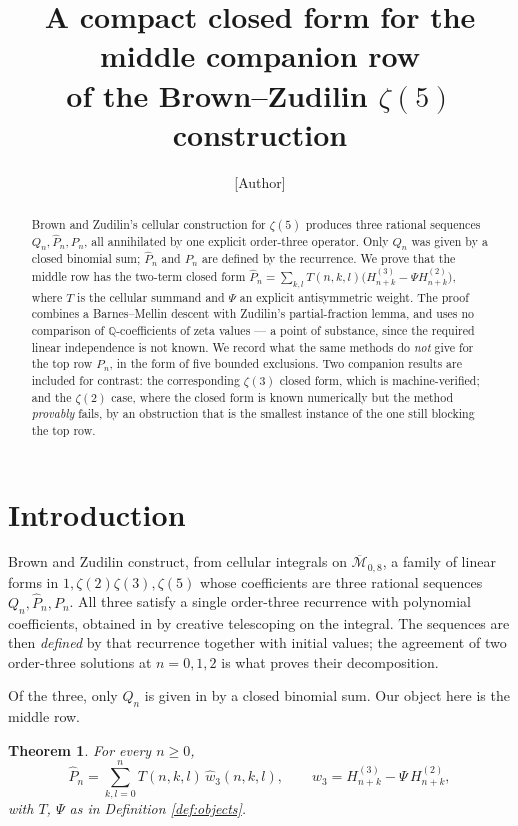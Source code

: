 \documentclass[11pt,a4paper]{amsart}
\title[A closed form for the Brown--Zudilin middle row]{A compact closed form for the
middle companion row\\ of the Brown--Zudilin $\zeta(5)$ construction}
\author{[Author]}
\date{}
\theoremstyle{plain}
\newtheorem{theorem}{Theorem}[section]
\theoremstyle{definition}
\theoremstyle{remark}
\newcommand{\QQ}{\mathbb{Q}}
\newcommand{\T}{T}
\begin{document}
\begin{abstract}
Brown and Zudilin's cellular construction for $\zeta(5)$ produces three rational sequences
$Q_n,\widehat P_n,P_n$, all annihilated by one explicit order-three operator. Only $Q_n$ was
given by a closed binomial sum; $\widehat P_n$ and $P_n$ are defined by the recurrence. We prove
that the middle row has the two-term closed form
$\widehat P_n=\sum_{k,l}\T(n,k,l)\bigl(H^{(3)}_{n+k}-\Psi H^{(2)}_{n+k}\bigr)$, where $\T$ is the
cellular summand and $\Psi$ an explicit antisymmetric weight. The proof combines a Barnes--Mellin
descent with Zudilin's partial-fraction lemma, and uses no comparison of $\QQ$-coefficients of
zeta values --- a point of substance, since the required linear independence is not known. We
record what the same methods do \emph{not} give for the top row $P_n$, in the form of five
bounded exclusions. Two companion results are included for contrast: the corresponding
$\zeta(3)$ closed form, which is machine-verified; and the $\zeta(2)$ case, where the closed
form is known numerically but the method \emph{provably} fails, by an obstruction that is the
smallest instance of the one still blocking the top row.
\end{abstract}
\maketitle

\section{Introduction}

Brown and Zudilin \cite{BZ} construct, from cellular integrals on $\overline{\mathcal M}_{0,8}$,
a family of linear forms in $1,\zeta(2)\zeta(3),\zeta(5)$ whose coefficients are three rational
sequences $Q_n,\widehat P_n,P_n$. All three satisfy a single order-three recurrence with
polynomial coefficients, obtained in \cite{BZ} by creative telescoping on the integral. The
sequences are then \emph{defined} by that recurrence together with initial values; the agreement
of two order-three solutions at $n=0,1,2$ is what proves their decomposition.

Of the three, only $Q_n$ is given in \cite{BZ} by a closed binomial sum. Our object here is the
middle row.

\begin{theorem}\label{thm:main}
For every $n\ge0$,
\[
  \widehat P_n=\sum_{k,l=0}^{n}\T(n,k,l)\,\widehat w_3(n,k,l),
  \qquad \widehat w_3=H^{(3)}_{n+k}-\Psi\,H^{(2)}_{n+k},
\]
with $\T$, $\Psi$ as in Definition \ref{def:objects}.
\end{theorem}
\end{document}
